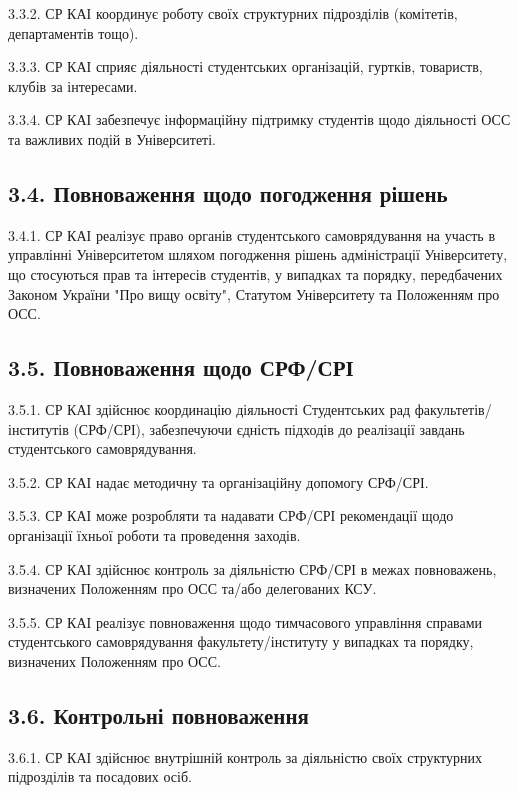     3.3.2. СР КАІ координує роботу своїх структурних підрозділів (комітетів, департаментів тощо).

    3.3.3. СР КАІ сприяє діяльності студентських організацій, гуртків, товариств, клубів за інтересами.

    3.3.4. СР КАІ забезпечує інформаційну підтримку студентів щодо діяльності ОСС та важливих подій в Університеті.

\subsection*{3.4. Повноваження щодо погодження рішень}
    3.4.1. СР КАІ реалізує право органів студентського самоврядування на участь в управлінні Університетом шляхом погодження рішень адміністрації Університету, що стосуються прав та інтересів студентів, у випадках та порядку, передбачених Законом України "Про вищу освіту", Статутом Університету та Положенням про ОСС.

\subsection*{3.5. Повноваження щодо СРФ/СРІ}
    3.5.1. СР КАІ здійснює координацію діяльності Студентських рад факультетів/інститутів (СРФ/СРІ), забезпечуючи єдність підходів до реалізації завдань студентського самоврядування.

    3.5.2. СР КАІ надає методичну та організаційну допомогу СРФ/СРІ.

    3.5.3. СР КАІ може розробляти та надавати СРФ/СРІ рекомендації щодо організації їхньої роботи та проведення заходів.

    3.5.4. СР КАІ здійснює контроль за діяльністю СРФ/СРІ в межах повноважень, визначених Положенням про ОСС та/або делегованих КСУ.

    3.5.5. СР КАІ реалізує повноваження щодо тимчасового управління справами студентського самоврядування факультету/інституту у випадках та порядку, визначених Положенням про ОСС.

\subsection*{3.6. Контрольні повноваження}
    3.6.1. СР КАІ здійснює внутрішній контроль за діяльністю своїх структурних підрозділів та посадових осіб.

